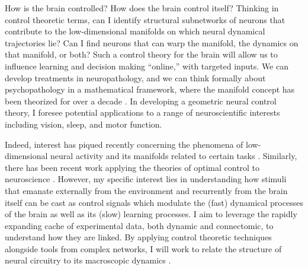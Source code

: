 \documentclass[a4paper,12pt]{article}
\begin{document}








How is the brain controlled? How does the brain control itself? Thinking in control theoretic terms, can I identify structural subnetworks of neurons that contribute to the low-dimensional manifolds on which neural dynamical trajectories lie? Can I find neurons that can warp the manifold, the dynamics on that manifold, or both? Such a control theory for the brain will allow us to influence learning and decision making ``online,'' with targeted inputs. We can develop treatments in neuropathology, and we can think formally about psychopathology in a mathematical framework, where the manifold concept has been theorized for over a decade \cite{Gallese2003}. In developing a geometric neural control theory, I foresee potential applications to a range of neuroscientific interests including vision, sleep, and motor function. 

Indeed, interest has piqued recently concerning the phenomena of low-dimensional neural activity and its manifolds related to certain tasks \cite{Gao2015, Gao2017, Sadtler2014}. Similarly, there has been recent work applying the theories of optimal control to neuroscience \cite{Schiff2012}. However, my specific interest lies in understanding how stimuli that emanate externally from the environment and recurrently from the brain itself can be cast as control signals which modulate the (fast) dynamical processes of the brain as well as its (slow) learning processes. I aim to leverage the rapidly expanding cache of experimental data, both dynamic and connectomic, to understand how they are linked. By applying control theoretic techniques alongside tools from complex networks, I will work to relate the structure of neural circuitry to its macroscopic dynamics \cite{Brockett2014,Tang2017, Zanudo2016}. 
\end{document}
